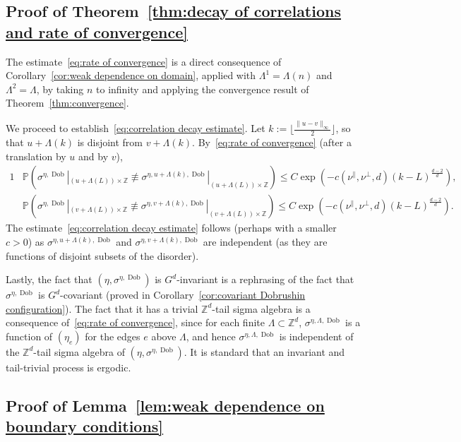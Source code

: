 \documentclass[11pt, reqno]{amsart}
\newcommand{\Z}{\mathbb{Z}}
\DeclareMathOperator{\Dob}{Dob}
\renewcommand{\P}{\mathbb{P}}
\numberwithin{equation}{section}
\begin{document}
\subsection{Proof of Theorem~\ref{thm:decay of correlations and rate of convergence}}
The estimate~\eqref{eq:rate of convergence} is a direct consequence of Corollary~\ref{cor:weak dependence on domain}, applied with $\Lambda^1 = \Lambda(n)$ and $\Lambda^2=\Lambda$, by taking $n$ to infinity and applying the convergence result of Theorem~\ref{thm:convergence}.

We proceed to establish~\eqref{eq:correlation decay estimate}. Let $k := \lfloor\frac{\|u-v\|_\infty}{2}\rfloor$, so that $u+\Lambda(k)$ is disjoint from $v+\Lambda(k)$. By~\eqref{eq:rate of convergence} (after a translation by $u$ and by $v$),
\begin{alignat*}{1}
&\P\left(\sigma^{\eta,\Dob}|_{(u+\Lambda(L))\times\Z}\not\equiv \sigma^{\eta,u+\Lambda(k),\Dob}|_{(u+\Lambda(L))\times\Z}\right)\le C\exp \left(-c(\nu^{\parallel},\nu^{\perp},d)\left(k - L\right)^{\frac{d-2}{d}} \right),\\
&\P\left(\sigma^{\eta,\Dob}|_{(v+\Lambda(L))\times\Z}\not\equiv \sigma^{\eta,v+\Lambda(k),\Dob}|_{(v+\Lambda(L))\times\Z}\right)\le C\exp \left(-c(\nu^{\parallel},\nu^{\perp},d)\left(k - L\right)^{\frac{d-2}{d}} \right).
\end{alignat*}
The estimate~\eqref{eq:correlation decay estimate} follows (perhaps with a smaller $c>0$) as $\sigma^{\eta,u+\Lambda(k),\Dob}$ and $\sigma^{\eta,v+\Lambda(k),\Dob}$ are independent (as they are functions of disjoint subsets of the disorder).

Lastly, the fact that $(\eta,\sigma^{\eta,\Dob})$ is $G^d$-invariant is a rephrasing of the fact that $\sigma^{\eta,\Dob}$ is $G^d$-covariant (proved in Corollary~\ref{cor:covariant Dobrushin configuration}). The fact that it has a trivial $\Z^d$-tail sigma algebra is a consequence of~\eqref{eq:rate of convergence}, since for each finite $\Lambda\subset\Z^d$, $\sigma^{\eta,\Lambda,\Dob}$ is a function of $(\eta_e)$ for the edges $e$ above $\Lambda$, and hence $\sigma^{\eta,\Lambda,\Dob}$ is independent of the $\Z^d$-tail sigma algebra of $(\eta,\sigma^{\eta,\Dob})$. It is standard that an invariant and tail-trivial process is ergodic.

\subsection{Proof of Lemma~\ref{lem:weak dependence on boundary conditions}}
\label{sec:proof of weak dependence on boundary lemma}
\end{document}
